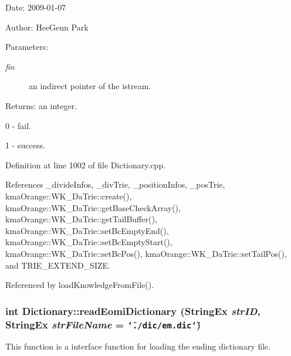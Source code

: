 \begin{Desc}
\item[Date:]2009-01-07 \end{Desc}
\begin{Desc}
\item[Author:]HeeGeun Park \end{Desc}
\begin{Desc}
\item[Parameters:]
\begin{description}
\item[{\em fin}]an indirect pointer of the istream. \end{description}
\end{Desc}
\begin{Desc}
\item[Returns:]an integer.\par
 0 - fail.\par
 1 - success. \end{Desc}


Definition at line 1002 of file Dictionary.cpp.

References \_\-divideInfos, \_\-divTrie, \_\-positionInfos, \_\-posTrie, kmaOrange::WK\_\-DaTrie::create(), kmaOrange::WK\_\-DaTrie::getBaseCheckArray(), kmaOrange::WK\_\-DaTrie::getTailBuffer(), kmaOrange::WK\_\-DaTrie::setBcEmptyEnd(), kmaOrange::WK\_\-DaTrie::setBcEmptyStart(), kmaOrange::WK\_\-DaTrie::setBcPos(), kmaOrange::WK\_\-DaTrie::setTailPos(), and TRIE\_\-EXTEND\_\-SIZE.

Referenced by loadKnowledgeFromFile().\hypertarget{classkmaOrange_1_1Dictionary_1a8b6abce191eca63d1d9bfeaf0ee792}{
\subsubsection[{readEomiDictionary}]{\setlength{\rightskip}{0pt plus 5cm}int Dictionary::readEomiDictionary ({\bf StringEx} {\em strID}, \/  {\bf StringEx} {\em strFileName} = {\tt \char`\"{}./dic/em.dic\char`\"{}})}}
\label{classkmaOrange_1_1Dictionary_1a8b6abce191eca63d1d9bfeaf0ee792}


This function is a interface function for loading the ending dictionary file. 

